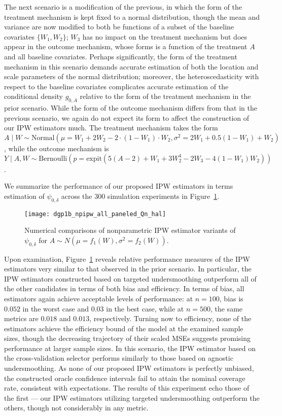 The next scenario is a modification of the previous, in which the form of the
treatment mechanism is kept fixed to a normal distribution, though the mean and
variance are now modified to both be functions of a subset of the baseline
covariates $\{W_1, W_2\}$; $W_3$ has no impact on the treatment mechanism but
does appear in the outcome mechanism, whose forms is a function of the treatment
$A$ and all baseline covariates. Perhaps significantly, the form of the
treatment mechanism in this scenario demands accurate estimation of both the
location and scale parameters of the normal distribution; moreover, the
heteroscedasticity with respect to the baseline covariates complicates accurate
estimation of the conditional density $g_{0,A}$ relative to the form of the
treatment mechanism in the prior scenario. While the form of the outcome
mechanism differs from that in the previous scenario, we again do not expect its
form to affect the construction of our IPW estimators much. The treatment
mechanism takes the form $A \mid W \sim \text{Normal}\left(\mu = W_1 + 2 W_2
- 2 \cdot (1 - W_1) \cdot W_2, \sigma^2 = 2 W_1 + 0.5 (1 - W_1) + W_2 \right)$,
while the outcome mechanism is $Y \mid A, W \sim \text{Bernoulli}\left(p
= \text{expit}(5 (A - 2) + W_1 + 3 W_2^4 - 2 W_3 - \allowbreak 4 (1 - W_1)
W_2)\right)$.

We summarize the performance of our proposed IPW estimators in terms estimation
of $\psi_{0,\delta}$ across the $300$ simulation experiments in
Figure~\ref{fig:dgp1b_npipw}.
\begin{figure}[H]
  \centering
  \texttt{[image: dgp1b\_npipw\_all\_paneled\_Qn\_hal]}
  \caption{Numerical comparisons of nonparametric IPW estimator variants of
     $\psi_{0,\delta}$ for $A \sim N(\mu = f_1(W), \sigma^2 = f_2(W))$.}
  \label{fig:dgp1b_npipw}
\end{figure}
Upon examination, Figure~\ref{fig:dgp1b_npipw} reveals relative performance
measures of the IPW estimators very similar to that observed in the prior
scenario. In particular, the IPW estimators constructed based on targeted
undersmoothing outperform all of the other candidates in terms of both bias and
efficiency. In terms of bias, all estimators again achieve acceptable levels of
performance: at $n=100$, bias is $0.052$ in the worst case and $0.03$ in the
best case, while at $n=500$, the same metrics are $0.018$ and $0.013$,
respectively. Turning now to efficiency, none of the estimators achieve the
efficiency bound of the model at the examined sample sizes, though the
decreasing trajectory of their scaled MSEs suggests promising performance at
larger sample sizes. In this scenario, the IPW estimator based on the
cross-validation selector performs similarly to those based on agnostic
undersmoothing. As none of our proposed IPW estimators is perfectly unbiased,
the constructed oracle confidence intervals fail to attain the nominal coverage
rate, consistent with expectations. The results of this experiment echo those of
the first --- our IPW estimators utilizing targeted undersmoothing outperform
the others, though not considerably in any metric.

